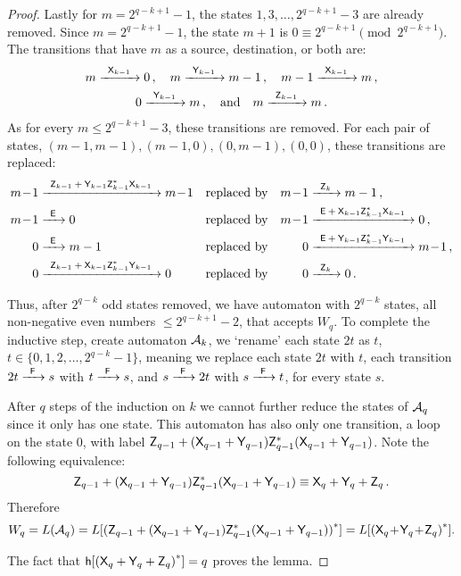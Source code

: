 \begin{proof}
    Lastly for $m = 2^{q-k+1}-1$,  the states $1, 3, \dotsc, 2^{q-k+1}-3$ are already removed. Since $m = 2^{q-k+1}-1$, the state $m+1$ is $0 \equiv 2^{q-k+1} \pmod{2^{q-k+1}}$. The transitions that have $m$ as a source, destination, or both are:
    \begin{multline*}
        m {\; \xrightarrow[]{\: \; {\mathsf{X}}_{k-1} \: \;} \;} 0 \, , \quad m {\; \xrightarrow[]{\: \; {\mathsf{Y}}_{k-1} \: \;} \;} m-1 \, , \quad m-1 {\; \xrightarrow[]{\: \; {\mathsf{X}}_{k-1} \: \;} \;} m \, , \\
        0 {\; \xrightarrow[]{\: \; {\mathsf{Y}}_{k-1} \: \;} \;} m \, , \quad \text{and} \quad m {\; \xrightarrow[]{\: \; {\mathsf{Z}}_{k-1} \: \;} \;} m \, .
    \end{multline*}
    As for every $m \leq 2^{q-k+1}-3$, these transitions are removed. For each pair of states, $(m-1,m-1), (m-1,0), (0,m-1), (0,0)$, these transitions are replaced:
    \begin{align*}
        m \! - \! 1 &\tr{\re{Z}_{k-1} \: + \: \re{Y}_{k-1}\re{Z}_{k-1}^*\re{X}_{k-1}} m \! - \! 1 & &\text{replaced by} & m \! - \! 1 &\tr{\re{Z}_k} m-1 \, , \\
        m \! - \! 1 &\tr{\re{E}} 0 & &\text{replaced by} & m \! - \! 1 &\tr{\re{E} \: + \: \re{X}_{k-1}\re{Z}_{k-1}^*\re{X}_{k-1}} 0 \, , \\
        0 &\tr{\re{E}} m-1 & &\text{replaced by} & 0 &\tr{\re{E} \: + \: \re{Y}_{k-1}\re{Z}_{k-1}^*\re{Y}_{k-1}} m \! - \! 1 \, , \\
        0 &\tr{\re{Z}_{k-1} \: + \: \re{X}_{k-1}\re{Z}_{k-1}^*\re{Y}_{k-1}} 0 & &\text{replaced by} & 0 &\tr{\re{Z}_k} 0 \, .
    \end{align*}

    Thus, after $2^{q-k}$ odd states removed, we have automaton with $2^{q-k}$ states, all non-negative even numbers $\leq 2^{q-k+1}-2$, that accepts $W_q$. To complete the inductive step, create automaton ${\mathcal{A}}_k$, we `rename' each state $2t$ as $t$, $t \in \{ 0, 1, 2, \dotsc, 2^{q-k}-1 \}$, meaning we replace each state $2t$ with $t$, each transition $2t {\; \xrightarrow[]{\: \; {\mathsf{F}} \: \;} \;} s$ with $t {\; \xrightarrow[]{\: \; {\mathsf{F}} \: \;} \;} s$, and $s {\; \xrightarrow[]{\: \; {\mathsf{F}} \: \;} \;} 2t$ with $s {\; \xrightarrow[]{\: \; {\mathsf{F}} \: \;} \;} t$, for every state $s$.

    After $q$ steps of the induction on $k$ we cannot further reduce the states of ${\mathcal{A}}_q$ since it only has one state. This automaton has also only one transition, a loop on the state $0$, with label ${\mathsf{Z}}_{q-1} + ({\mathsf{X}}_{q-1} + {\mathsf{Y}}_{q-1}){\mathsf{Z}}_{q-1}^*({\mathsf{X}}_{q-1} + {\mathsf{Y}}_{q-1})$. Note the following equivalence:
    \[
        {\mathsf{Z}}_{q-1} + ({\mathsf{X}}_{q-1} + {\mathsf{Y}}_{q-1}){\mathsf{Z}}_{q-1}^*({\mathsf{X}}_{q-1} + {\mathsf{Y}}_{q-1}) \equiv {\mathsf{X}}_q + {\mathsf{Y}}_q + {\mathsf{Z}}_q \, . \\
    \]
    Therefore
    \[
        W_q = L({\mathcal{A}}_q) = L[{({\mathsf{Z}}_{q-1} + ({\mathsf{X}}_{q-1} + {\mathsf{Y}}_{q-1}){\mathsf{Z}}_{q-1}^*({\mathsf{X}}_{q-1} + {\mathsf{Y}}_{q-1}))}^*] = L[{({\mathsf{X}}_q \! + \! {\mathsf{Y}}_q \! + \! {\mathsf{Z}}_q)}^*].
    \]

    The fact that ${\mathsf{h}[{({\mathsf{X}}_q + {\mathsf{Y}}_q + {\mathsf{Z}}_q)}^*]} = q$ proves the lemma.
\end{proof}

